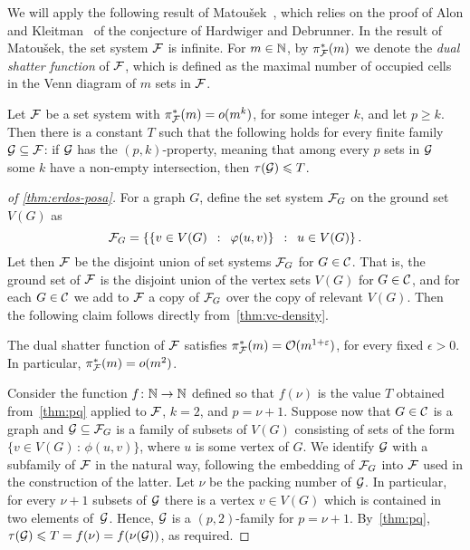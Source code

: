 We will apply the following result of Matou{\v s}ek~\cite{Matousek:2004:BVI:1005787.1005789},
which relies on the proof of Alon and Kleitman~\cite{ALON1992103} of the conjecture of Hardwiger and Debrunner. 
In the result of Matou{\v s}ek, the set system $\cal F$ is infinite. For $m\in \N$, by $\pi_{\cal F}^*(m)$ we denote the \emph{dual shatter function} of $\cal F$, which is defined as the maximal number 
of occupied cells in the Venn diagram of $m$ sets in $\cal F$.


\begin{theorem}\label{thm:pq}
	Let $\cal F$ be a set system with $\pi^*_{\cal F}(m)=o(m^k)$,
	for some integer $k$, and let $p\ge k$.
	Then there is a constant $T$ such that the following holds for every finite family $\cal G\subset \cal F$: 
	if $\cal G$ has the $(p,k)$-property, meaning that 
	among every $p$ sets in $\cal G$ some $k$ have a non-empty intersection, then $\tau ({\cal G})\le T$.
\end{theorem}
\begin{proof}[of \cref{thm:erdos-posa}]
For a graph $G$, define the set system ${\cal F}_G$ on the ground set $V(G)$ as
$${\cal F}_G = \setof{\setof{v\in V(G)}{\phi(u, v)}}{u\in V(G)}.$$
Let then $\cal F$ be the disjoint union of set systems ${\cal F}_G$ for $G\in \CCC$. That is, 
the ground set of $\cal F$ is the disjoint union of the vertex sets $V(G)$ for $G\in \CCC$, and for each $G\in \CCC$ we add to ${\cal F}$
a copy of ${\cal F}_G$ over the copy of relevant $V(G)$.
Then the following claim follows directly from~\cref{thm:vc-density}.

\begin{claim}
The dual shatter function of $\cal F$ satisfies $\pi^*_{\cal F}(m)=\Oof(m^{1+\epsilon})$,
for every fixed $\epsilon>0$. In particular, $\pi^*_{\cal F}(m)=o(m^{2})$.
\end{claim}

Consider the function $f\from \N \to \N$ defined so that $f(\nu)$ is the value $T$ obtained from~\cref{thm:pq} applied to $\cal F$, $k=2$, and $p=\nu+1$.
Suppose now that $G\in \CCC$ is a graph and $\GGG\subseteq \FFF_G$
is a family of subsets of $V(G)$ consisting of sets of the form $\{v\in V(G)\,\colon\,\phi(u,v)\}$, where $u$ is some vertex of $G$.
We identify $\GGG$ with a subfamily of $\FFF$ in the natural way, following the embedding of $\FFF_G$ into $\FFF$ used in the construction of the latter.
Let $\nu$ be the packing number of $\GGG$.
In particular, for every $\nu+1$ subsets of $\GGG$
there is a vertex $v\in V(G)$
which is contained in two elements of~$\GGG$.
Hence, $\GGG$ is a $(p,2)$-family for $p=\nu+1$.
By~\cref{thm:pq}, $\tau(\GGG)\le T=f(\nu)=f(\nu(\GGG))$, as required.
\end{proof}
